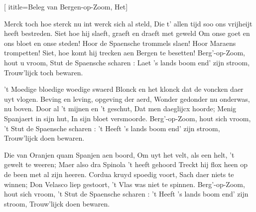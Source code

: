  [
ititle={Beleg van Bergen-op-Zoom, Het}]


\beginverse
Merck toch hoe sterck nu int werck sich al steld,
Die t' allen tijd soo ons vrijheijt heeft bestreden.
Siet hoe hij slaeft, graeft en draeft met geweld
Om onse goet en ons bloet en onse steden!
Hoor de Spaensche trommels slaen!
Hoor Maraens trompetten!
Siet, hoe komt hij trecken aen
Bergen te besetten!
Berg'-op-Zoom, hout u vroom,
Stut de Spaensche scharen :
Laet 's lands boom end' zijn stroom,
Trouw'lijck toch bewaren.
\endverse

\beginverse
't Moedige bloedige woedige swaerd
Blonck en het klonck dat de voncken daer uyt vlogen.
Beving en leving, opgeving der aerd,
Wonder gedonder nu onderwas, nu boven.
Door al 't mijnen en 't geschut,
Dat men daeglijcx hoorde;
Menig Spanjaert in sijn hut,
In sijn bloet versmoorde.
Berg'-op-Zoom, hout sich vroom,
't Stut de Spaensche scharen :
't Heeft 's lands boom end' zijn stroom,
Trouw'lijck doen bewaren.
\endverse

\beginverse
Die van Oranjen quam Spanjen aen boord,
Om uyt het velt, als een helt, 't gewelt te weeren;
Maer also dra Spinola 't heeft gehoord
Treckt hij flox heen op de been met al zijn heeren.
Cordua kruyd spoedig voort,
Sach daer niets te winnen;
Don Velasco liep gestoort,
't Vlas was niet te spinnen.
Berg'-op-Zoom, hout sich vroom,
't Stut de Spaensche scharen :
't Heeft 's lands boom end' zijn stroom,
Trouw'lijck doen bewaren.
\endverse
\endsong